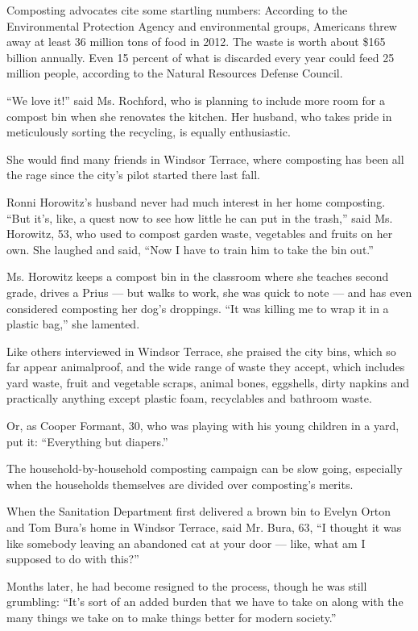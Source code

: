 Composting advocates cite some startling numbers: According to the
Environmental Protection Agency and environmental groups, Americans
threw away at least 36 million tons of food in 2012. The waste is worth
about \$165 billion annually. Even 15 percent of what is discarded every
year could feed 25 million people, according to the Natural Resources
Defense Council.

``We love it!'' said Ms. Rochford, who is planning to include more room
for a compost bin when she renovates the kitchen. Her husband, who takes
pride in meticulously sorting the recycling, is equally enthusiastic.

She would find many friends in Windsor Terrace, where composting has
been all the rage since the city's pilot started there last fall.

Ronni Horowitz's husband never had much interest in her home composting.
``But it's, like, a quest now to see how little he can put in the
trash,'' said Ms. Horowitz, 53, who used to compost garden waste,
vegetables and fruits on her own. She laughed and said, ``Now I have to
train him to take the bin out.''

Ms. Horowitz keeps a compost bin in the classroom where she teaches
second grade, drives a Prius --- but walks to work, she was quick to
note --- and has even considered composting her dog's droppings. ``It
was killing me to wrap it in a plastic bag,'' she lamented.

Like others interviewed in Windsor Terrace, she praised the city bins,
which so far appear animalproof, and the wide range of waste they
accept, which includes yard waste, fruit and vegetable scraps, animal
bones, eggshells, dirty napkins and practically anything except plastic
foam, recyclables and bathroom waste.

Or, as Cooper Formant, 30, who was playing with his young children in a
yard, put it: ``Everything but diapers.''

The household-by-household composting campaign can be slow going,
especially when the households themselves are divided over composting's
merits.

When the Sanitation Department first delivered a brown bin to Evelyn
Orton and Tom Bura's home in Windsor Terrace, said Mr. Bura, 63, ``I
thought it was like somebody leaving an abandoned cat at your door ---
like, what am I supposed to do with this?''

Months later, he had become resigned to the process, though he was still
grumbling: ``It's sort of an added burden that we have to take on along
with the many things we take on to make things better for modern
society.''

